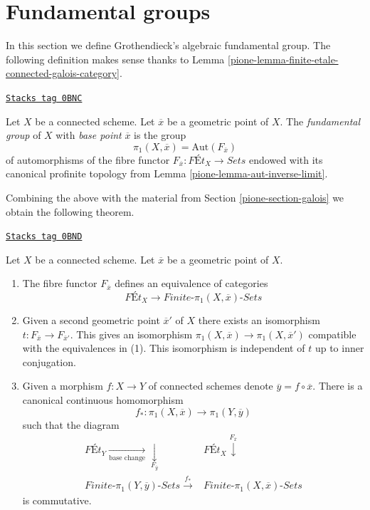 \section{Fundamental groups}
\label{pione-section-fundamental-groups}
In this section we define Grothendieck's algebraic fundamental group.
The following definition makes sense thanks to
Lemma \ref{pione-lemma-finite-etale-connected-galois-category}.

\begin{definition}
\label{pione-definition-fundamental-group}
\href{https://stacks.math.columbia.edu/tag/0BNC}{\texttt{Stacks tag 0BNC}}

Let $X$ be a connected scheme. Let $\overline{x}$ be a geometric point
of $X$. The {\it fundamental group} of $X$ with
{\it base point} $\overline{x}$ is the group
$$
\pi_1(X, \overline{x}) = \text{Aut}(F_{\overline{x}})
$$
of automorphisms of the fibre functor
$F_{\overline{x}} : \textit{F\'Et}_X \to \textit{Sets}$
endowed with its canonical profinite topology from
Lemma \ref{pione-lemma-aut-inverse-limit}.
\end{definition}

Combining the above with the material from Section \ref{pione-section-galois}
we obtain the following theorem.

\begin{theorem}
\label{pione-theorem-fundamental-group}
\href{https://stacks.math.columbia.edu/tag/0BND}{\texttt{Stacks tag 0BND}}

Let $X$ be a connected scheme. Let $\overline{x}$ be a geometric point
of $X$.
\begin{enumerate}
\item The fibre functor $F_{\overline{x}}$ defines an equivalence of
categories
$$
\textit{F\'Et}_X \longrightarrow
\textit{Finite-}\pi_1(X, \overline{x})\textit{-Sets}
$$
\item Given a second geometric point $\overline{x}'$ of $X$ there
exists an isomorphism $t : F_{\overline{x}} \to F_{\overline{x}'}$.
This gives an isomorphism $\pi_1(X, \overline{x}) \to \pi_1(X, \overline{x}')$
compatible with the equivalences in (1). This isomorphism is
independent of $t$ up to inner conjugation.
\item Given a morphism $f : X \to Y$ of connected schemes denote
$\overline{y} = f \circ \overline{x}$. There is a canonical
continuous homomorphism
$$
f_* : \pi_1(X, \overline{x}) \to \pi_1(Y, \overline{y})
$$
such that the diagram
$$
\begin{array}{cc}\textit{F\'Et}_Y \underset{\text{base change}}{\longrightarrow}\underset{F_{\overline{y}}}{\downarrow} & \textit{F\'Et}_X \overset{F_{\overline{x}}}{\downarrow} \\ \textit{Finite-}\pi_1(Y, \overline{y})\textit{-Sets} \overset{f_*}{\longrightarrow} & \textit{Finite-}\pi_1(X, \overline{x})\textit{-Sets}\end{array}
$$
is commutative.
\end{enumerate}
\end{theorem}

